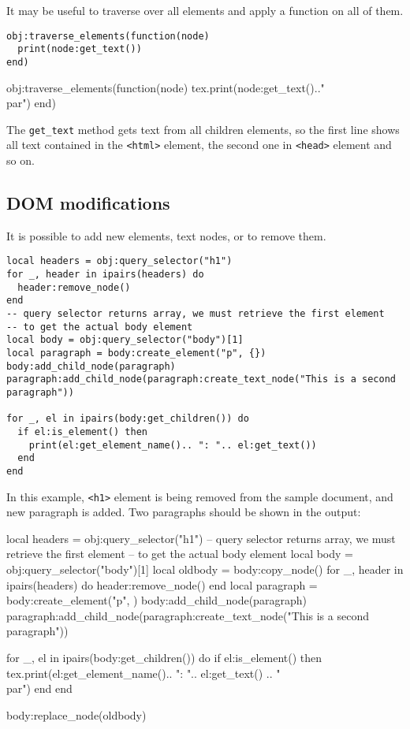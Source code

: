 \documentclass{ltxdoc}
\begin{document}
It may be useful to traverse over all elements and apply a function on all of them. 

\begin{verbatim}
obj:traverse_elements(function(node)
  print(node:get_text())
end)
\end{verbatim}

\begin{framed}
  \begin{luacode*}
obj:traverse_elements(function(node)
  tex.print(node:get_text().."\\par")
end)
  \end{luacode*}
\end{framed}

The \verb|get_text| method gets text from all children elements, so the first
line shows all text contained in the \verb|<html>| element, the second one in
\verb|<head>| element and so on.  

\subsection{DOM modifications}

It is possible to add new elements, text nodes, or to remove them. 

\begin{verbatim}
local headers = obj:query_selector("h1")
for _, header in ipairs(headers) do
  header:remove_node()
end
-- query selector returns array, we must retrieve the first element
-- to get the actual body element
local body = obj:query_selector("body")[1]
local paragraph = body:create_element("p", {})
body:add_child_node(paragraph)
paragraph:add_child_node(paragraph:create_text_node("This is a second paragraph"))

for _, el in ipairs(body:get_children()) do
  if el:is_element() then
    print(el:get_element_name().. ": ".. el:get_text())
  end
end
\end{verbatim}

In this example, \verb|<h1>| element is being removed from the sample document, and new 
paragraph is added. Two paragraphs should be shown in the output:

\begin{framed}
  \begin{luacode*}
local headers = obj:query_selector("h1")
-- query selector returns array, we must retrieve the first element
-- to get the actual body element
local body = obj:query_selector("body")[1]
local oldbody = body:copy_node()
for _, header in ipairs(headers) do
  header:remove_node()
end
local paragraph = body:create_element("p", {})
body:add_child_node(paragraph)
paragraph:add_child_node(paragraph:create_text_node("This is a second paragraph"))

for _, el in ipairs(body:get_children()) do
if el:is_element() then
  tex.print(el:get_element_name().. ": ".. el:get_text() .. "\\par")
end
end

body:replace_node(oldbody)
  \end{luacode*}
\end{framed}
\end{document}
